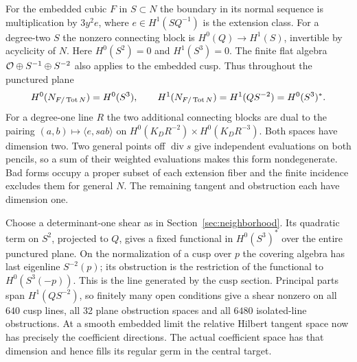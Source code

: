 For the embedded cubic $F$ in $S\subset N$ the boundary in its
normal sequence is multiplication by $3y^2 e$, where
$e\in H^1(SQ^{-1})$ is the extension class. For a degree-two $S$
the nonzero connecting block is $H^0(Q)\to H^1(S)$, invertible by
acyclicity of $N$. Here $H^0(S^2)=0$ and $H^1(S^3)=0$. The finite
flat algebra $\mathcal O\oplus S^{-1}\oplus S^{-2}$ also applies to the
embedded cusp. Thus throughout the punctured plane
\[
 H^0(N_{F/\operatorname{Tot} N})=H^0(S^3),\qquad H^1(N_{F/\operatorname{Tot} N})=
 H^1(QS^{-2})=H^0(S^3)^* .
\]
For a degree-one line $R$ the two additional connecting blocks are
dual to the pairing $(a,b)\mapsto\langle e,sab\rangle$ on
$H^0(K_DR^{-2})\times H^0(K_DR^{-3})$. Both spaces have dimension
two. Two general points off $\operatorname{div}s$ give independent
evaluations on both pencils, so a sum of their weighted evaluations
makes this form nondegenerate. Bad forms occupy a proper subset of
each extension fiber and the finite incidence excludes them for
general $N$. The remaining tangent and obstruction each have
dimension one.

Choose a determinant-one shear as in Section~\ref{sec:neighborhood}.
Its quadratic term on $S^2$, projected to $Q$, gives a fixed functional
in $H^0(S^3)^*$ over the entire punctured plane. On the normalization
of a cusp over $p$ the covering algebra has last eigenline
$S^{-2}(p)$; its obstruction is the restriction of the functional
to $H^0(S^3(-p))$. This is the line generated by the cusp section.
Principal parts span $H^1(QS^{-2})$, so finitely many open conditions
give a shear nonzero on all $640$ cusp lines, all 32 plane obstruction
spaces and all $6480$ isolated-line obstructions. At a smooth
embedded limit the relative Hilbert tangent space now has precisely
the coefficient directions. The actual coefficient space has that
dimension and hence fills its regular germ in the central target.

